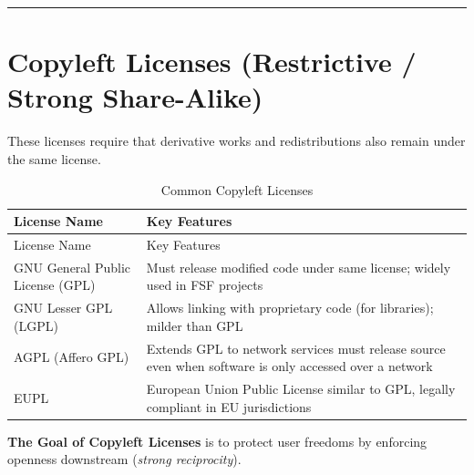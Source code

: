 \documentclass[
  11pt,
  letterpaper,
]{book}
\begin{document}
\begin{center}\rule{0.5\linewidth}{0.5pt}\end{center}

\section{Copyleft Licenses (Restrictive / Strong
Share-Alike)}\label{copyleft-licenses-restrictive-strong-share-alike}

These licenses require that derivative works and redistributions also
remain under the same license.

\begin{longtable}[]{@{}
  >{\raggedright\arraybackslash}p{}
  >{\raggedright\arraybackslash}p{}@{}}
\caption{Common Copyleft Licenses}\label{tbl-cllic}\tabularnewline
\toprule\noalign{}
\begin{minipage}[b]{\linewidth}\raggedright
License Name
\end{minipage} & \begin{minipage}[b]{\linewidth}\raggedright
Key Features
\end{minipage} \\
\midrule\noalign{}
\endfirsthead
\toprule\noalign{}
\begin{minipage}[b]{\linewidth}\raggedright
License Name
\end{minipage} & \begin{minipage}[b]{\linewidth}\raggedright
Key Features
\end{minipage} \\
\midrule\noalign{}
\endhead
\bottomrule\noalign{}
\endlastfoot
GNU General Public License (GPL) & Must release modified code under same
license; widely used in FSF projects \\
GNU Lesser GPL (LGPL) & Allows linking with proprietary code (for
libraries); milder than GPL \\
AGPL (Affero GPL) & Extends GPL to network services must release source
even when software is only accessed over a network \\
EUPL & European Union Public License similar to GPL, legally compliant
in EU jurisdictions \\
\end{longtable}

\textbf{The Goal of Copyleft Licenses} is to protect user freedoms by
enforcing openness downstream (\emph{strong reciprocity}).
\end{document}
